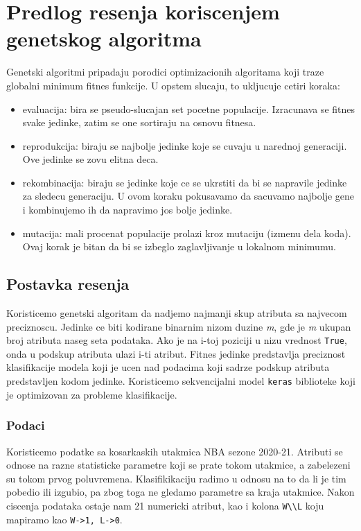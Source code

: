 \documentclass[11pt]{article} %
\begin{document}
\section{Predlog resenja koriscenjem genetskog algoritma}
Genetski algoritmi pripadaju porodici optimizacionih algoritama koji traze globalni minimum fitnes funkcije. U opstem slucaju, to ukljucuje cetiri koraka: \cite{Cui}
\begin{itemize}
\item evaluacija: bira se pseudo-slucajan set pocetne populacije. Izracunava se fitnes svake jedinke, zatim se one sortiraju na osnovu fitnesa.
\item reprodukcija: biraju se najbolje jedinke koje se cuvaju u narednoj generaciji. Ove jedinke se zovu elitna deca.
\item rekombinacija: biraju se jedinke koje ce se ukrstiti da bi se napravile jedinke za sledecu generaciju. U ovom koraku pokusavamo da sacuvamo najbolje gene i kombinujemo ih da napravimo jos bolje jedinke.
\item mutacija: mali procenat populacije prolazi kroz mutaciju (izmenu dela koda). Ovaj korak je bitan da bi se izbeglo zaglavljivanje u lokalnom minimumu.
\end{itemize}

\subsection{Postavka resenja}
Koristicemo genetski algoritam da nadjemo najmanji skup atributa sa najvecom preciznoscu. Jedinke ce biti kodirane binarnim nizom duzine \textit{m}, gde je \textit{m} ukupan broj atributa naseg seta podataka. Ako je na i-toj poziciji u nizu vrednost \lstinline{True}, onda u podskup atributa ulazi i-ti atribut. Fitnes jedinke predstavlja preciznost klasifikacije modela koji je ucen nad podacima koji sadrze podskup atributa predstavljen kodom jedinke. Koristicemo sekvencijalni model \lstinline{keras} biblioteke koji je optimizovan za probleme klasifikacije.
\subsubsection{Podaci}
Koristicemo podatke sa kosarkaskih utakmica NBA sezone 2020-21. Atributi se odnose na razne statisticke parametre koji se prate tokom utakmice, a zabelezeni su tokom prvog poluvremena. Klasifikikaciju radimo u odnosu na to da li je tim pobedio ili izgubio, pa zbog toga ne gledamo parametre sa kraja utakmice. Nakon ciscenja podataka ostaje nam 21 numericki atribut, kao i kolona \lstinline{W\\L} koju mapiramo kao \lstinline{W->1, L->0}. \newline
\end{document}
